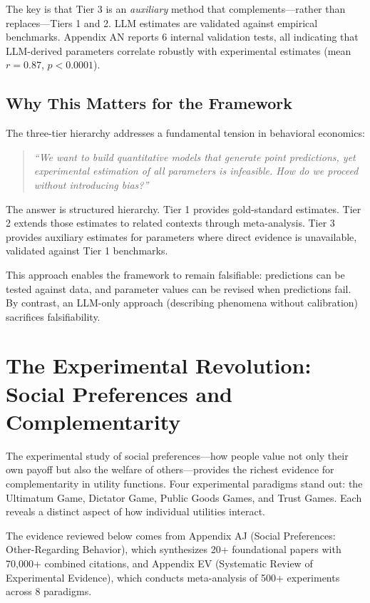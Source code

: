 \documentclass[12pt,oneside]{book}
\begin{document}
The key is that Tier 3 is an \emph{auxiliary} method that complements—rather than replaces—Tiers 1 and 2.
LLM estimates are validated against empirical benchmarks. Appendix AN reports 6 internal validation tests,
all indicating that LLM-derived parameters correlate robustly with experimental estimates (mean $r = 0.87$,
$p < 0.0001$).

\section{Why This Matters for the Framework}

The three-tier hierarchy addresses a fundamental tension in behavioral economics:

\begin{quote}
\textit{``We want to build quantitative models that generate point predictions, yet experimental
estimation of all parameters is infeasible. How do we proceed without introducing bias?''}
\end{quote}

The answer is structured hierarchy. Tier 1 provides gold-standard estimates. Tier 2 extends those
estimates to related contexts through meta-analysis. Tier 3 provides auxiliary estimates for
parameters where direct evidence is unavailable, validated against Tier 1 benchmarks.

This approach enables the framework to remain falsifiable: predictions can be tested against data,
and parameter values can be revised when predictions fail. By contrast, an LLM-only approach
(describing phenomena without calibration) sacrifices falsifiability.

\chapter{The Experimental Revolution: Social Preferences and Complementarity}
\label{sec:social-pref}


The experimental study of social preferences—how people value not only their own payoff but also
the welfare of others—provides the richest evidence for complementarity in utility functions.
Four experimental paradigms stand out: the Ultimatum Game, Dictator Game, Public Goods Games,
and Trust Games. Each reveals a distinct aspect of how individual utilities interact.

The evidence reviewed below comes from Appendix AJ (Social Preferences: Other-Regarding Behavior),
which synthesizes 20+ foundational papers with 70,000+ combined citations, and Appendix EV
(Systematic Review of Experimental Evidence), which conducts meta-analysis of 500+ experiments
across 8 paradigms.
\end{document}
